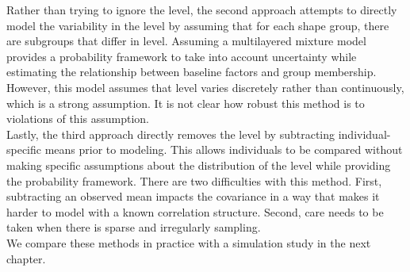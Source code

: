 \documentclass[12pt]{article}
\begin{document}
Rather than trying to ignore the level, the second approach attempts to directly model the variability in the level by assuming that for each shape group, there are subgroups that differ in level. Assuming a multilayered mixture model provides a probability framework to take into account uncertainty while estimating the relationship between baseline factors and group membership. However, this model assumes that level varies discretely rather than continuously, which is a strong assumption. It is not clear how robust this method is to violations of this assumption.\\

Lastly, the third approach directly removes the level by subtracting individual-specific means prior to modeling. This allows individuals to be compared without making specific assumptions about the distribution of the level while providing the probability framework.  There are two difficulties with this method. First, subtracting an observed mean impacts the covariance in a way that makes it harder to model with a known correlation structure. Second, care needs to be taken when there is sparse and irregularly sampling. \\

We compare these methods in practice with a simulation study in the next chapter.

	

\end{document}
